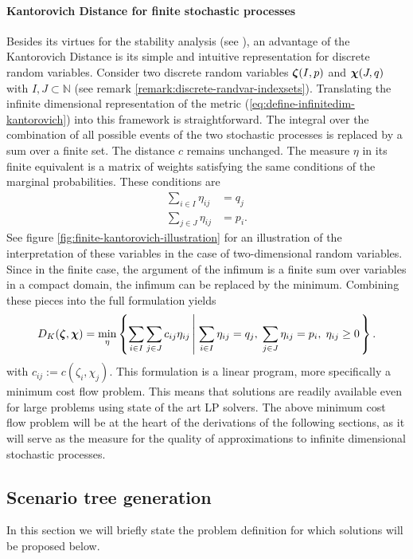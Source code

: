 \paragraph{Kantorovich Distance for finite stochastic processes}
Besides its virtues for the stability analysis (see \citet{Dupacova2003}), an advantage of the Kantorovich Distance is its simple and intuitive representation for discrete random variables.
Consider two discrete random variables $\boldsymbol\zeta(I, p)$ and $\boldsymbol\chi(J,q)$ with $I,J\subset\mathbb{N}$ (see remark \ref{remark:discrete-randvar-indexsets}).
Translating the infinite dimensional representation of the metric (\ref{eq:define-infinitedim-kantorovich}) into this framework is straightforward.
The integral over the combination of all possible events of the two stochastic processes is replaced by a sum over a finite set.
The distance $c$ remains unchanged.
The measure $\eta$ in its finite equivalent is a matrix of weights satisfying the same conditions of the marginal probabilities.
These conditions are
\begin{align}
  \label{eq:finitedim-marginals-eta}
  \sum_{i\in I} \eta_{ij} &= q_j\\
  \sum_{j\in J} \eta_{ij} &= p_i.
\end{align}
See figure \ref{fig:finite-kantorovich-illustration} for an illustration of the interpretation of these variables in the case of two-dimensional random variables.
Since in the finite case, the argument of the infimum is a finite sum over variables in a compact domain, the infimum can be replaced by the minimum.
Combining these pieces into the full formulation yields
\begin{equation}
  \label{eq:define-finitedim-Kantorovich}
  D_K(\boldsymbol\zeta, \boldsymbol\chi) = \min\limits_{\eta}\left\{\sum_{i\in I}\sum_{j\in J}c_{ij} \eta_{ij}\left|\; \sum_{i\in I}\eta_{ij}=q_j,\;\sum_{j\in J}\eta_{ij}=p_i,\;\eta_{ij}\geq 0\right.\right\}.
\end{equation}
with $c_{ij}:=c(\zeta_i,\chi_j)$.
This formulation is a linear program, more specifically a minimum cost flow problem.
This means that solutions are readily available even for large problems using state of the art LP solvers.
The above minimum cost flow problem will be at the heart of the derivations of the following sections, as it will serve as the measure for the quality of approximations to infinite dimensional stochastic processes.

\subsection{Scenario tree generation}
\label{sec:scen-tree-generation}
In this section we will briefly state the problem definition for which solutions will be proposed below.

